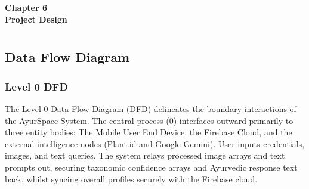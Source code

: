 
\newpage
\vspace*{\fill}
\begin{center}
\textbf{\Huge{Chapter 6}}\\
\vspace{5mm}
\textbf{\Huge{Project Design}}
\end{center}
\vspace*{\fill}
\newpage

\titleformat{\chapter}[block]{\normalfont}{}{0pt}{}
\titlespacing{\chapter}{0pt}{-2em}{0pt}
\chapter[Project Design]{}
\thispagestyle{fancy}
\titleformat{\chapter}[display]{\vspace{1cm}\normalfont\Large\bfseries\centering}{\chaptertitlename\ \thechapter}{20pt}{\vspace{0pt}}
\titlespacing*{\chapter}{0pt}{-50pt}{20pt}

\section{Data Flow Diagram}
\vspace{1cm}

\subsection{Level 0 DFD}

\sloppy
The Level 0 Data Flow Diagram (DFD) delineates the boundary interactions of the AyurSpace System. The central process (0) interfaces outward primarily to three entity bodies: The Mobile User End Device, the Firebase Cloud, and the external intelligence nodes (Plant.id and Google Gemini). User inputs credentials, images, and text queries. The system relays processed image arrays and text prompts out, securing taxonomic confidence arrays and Ayurvedic response text back, whilst syncing overall profiles securely with the Firebase cloud.
\fussy

